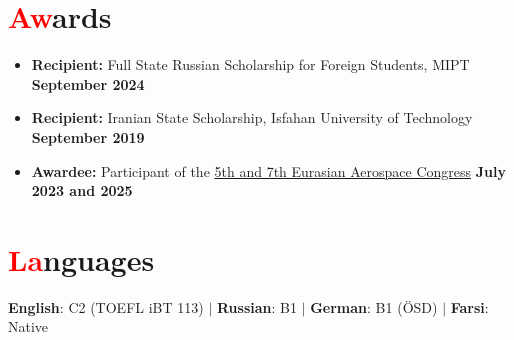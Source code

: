 \documentclass[a4paper,11pt]{article}
\newcommand{\resumeItem}[1]{
    \item\small{
        {#1 \vspace{-2pt}}
    }
}
\begin{document}
\section{{\textcolor{red}{Aw}ards}}
\begin{itemize}
     \resumeItem{\textbf{Recipient:} Full State Russian Scholarship for Foreign Students, MIPT} \hfill \textbf{September 2024}
    \resumeItem{\textbf{Recipient:} Iranian State Scholarship, Isfahan University of Technology} \hfill \textbf{September 2019}
    \resumeItem{\textbf{Awardee:} Participant of the \href{https://congress.aero/en/}{5th and 7th Eurasian Aerospace Congress}} \hfill \textbf{July 2023 and 2025}

\end{itemize}
\vspace{-15pt}

\section{{\textcolor{red}{La}nguages}}
\begin{center}
    \textbf{English}: C2 (TOEFL iBT 113) \quad $|$ \quad 
    \textbf{Russian}: B1 \quad $|$ \quad 
    \textbf{German}: B1 (ÖSD) \quad $|$ \quad 
    \textbf{Farsi}: Native
\end{center}
\end{document}
